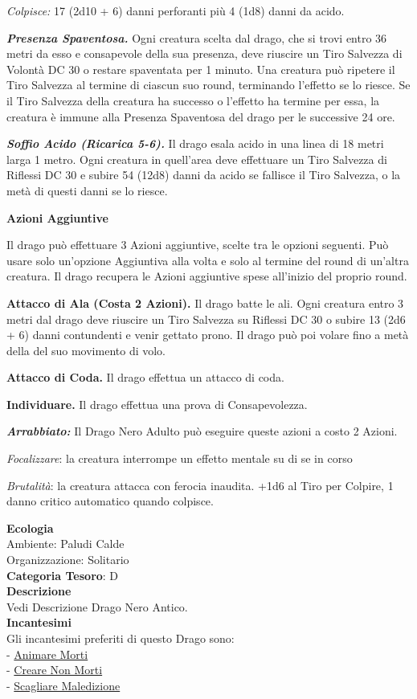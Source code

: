 \begin{multicols}{2}
{\emph{Colpisce:} 17 (2d10 + 6) danni perforanti più 4 (1d8) danni da acido.

\emph{\textbf{Presenza Spaventosa.}} Ogni creatura scelta dal drago, che si trovi entro 36 metri da esso e consapevole della sua presenza, deve riuscire un Tiro Salvezza di Volontà DC 30 o restare spaventata per 1 minuto. Una creatura può ripetere il Tiro Salvezza al termine di ciascun suo round, terminando l'effetto se lo riesce. Se il Tiro Salvezza della creatura ha successo o l'effetto ha termine per essa, la creatura è immune alla Presenza Spaventosa del drago per le successive 24 ore.

\emph{\textbf{Soffio Acido (Ricarica 5-6).}} Il drago esala acido in una linea di 18 metri larga 1 metro. Ogni creatura in quell'area deve effettuare un Tiro Salvezza di Riflessi DC 30 e subire 54 (12d8) danni da acido se fallisce il Tiro Salvezza, o la metà di questi danni se lo riesce.

\textbf{Azioni Aggiuntive}

Il drago può effettuare 3 Azioni aggiuntive, scelte tra le opzioni seguenti. Può usare solo un'opzione Aggiuntiva alla volta e solo al termine del round di un'altra creatura. Il drago recupera le Azioni aggiuntive spese all'inizio del proprio round.

\textbf{Attacco di Ala (Costa 2 Azioni).} Il drago batte le ali. Ogni creatura entro 3 metri dal drago deve riuscire un Tiro Salvezza su Riflessi DC 30 o subire 13 (2d6 + 6) danni contundenti e venir gettato prono. Il drago può poi volare fino a metà della del suo movimento di volo.

\textbf{Attacco di Coda.} Il drago effettua un attacco di coda.

\textbf{Individuare.} Il drago effettua una prova di Consapevolezza.

\emph{\textbf{Arrabbiato:}} Il Drago Nero Adulto può eseguire queste azioni a costo 2 Azioni.

\emph{Focalizzare}: la creatura interrompe un effetto mentale su di se in corso

\emph{Brutalità}: la creatura attacca con ferocia inaudita. +1d6 al Tiro per Colpire, 1 danno critico automatico quando colpisce.

\textbf{Ecologia}\\
Ambiente: Paludi Calde\\
Organizzazione: Solitario\\
\textbf{Categoria Tesoro}: D\\
\textbf{Descrizione}\\
Vedi Descrizione Drago Nero Antico.\\
\textbf{Incantesimi}\\
Gli incantesimi preferiti di questo Drago sono:\\
- \hyperlink{Animare Morti}{Animare Morti}\\
- \hyperlink{Creare Non Morti}{Creare Non Morti}\\
- \hyperlink{Scagliare Maledizione}{Scagliare Maledizione}

}
\end{multicols}
